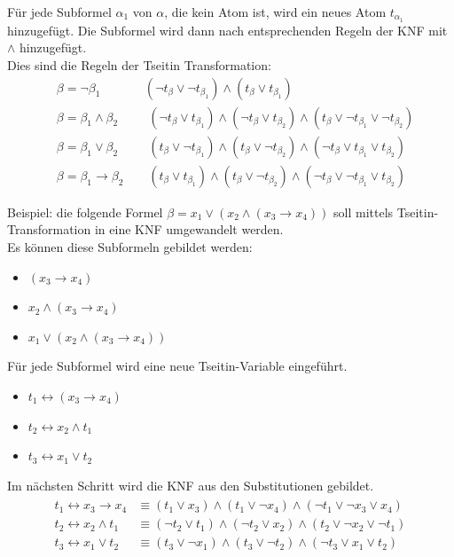 \documentclass[a4,abstract=on]{scrartcl}
\begin{document}
Für jede Subformel $\alpha_1$ von $\alpha$, die kein Atom ist, wird ein neues Atom $t_{\alpha_1}$ hinzugefügt. Die Subformel wird dann nach entsprechenden Regeln der KNF mit $\wedge$ hinzugefügt.\\

Dies sind die Regeln der Tseitin Transformation:
\begin{align*}
&\beta=\neg \beta_1 {~~~~~~~~~~~~~~~~} (\neg t_\beta \vee \neg t_{\beta_1 }) \wedge (t_\beta \vee t_{\beta_1})\\
&\beta=\beta_1 \wedge \beta_2 {~~~~~~~~~~~} (\neg t_\beta \vee  t_{\beta_1 }) \wedge (\neg t_\beta \vee t_{\beta_2}) \wedge (t_\beta \vee \neg t_{\beta_1} \vee \neg t_{\beta_2})\\
&\beta=\beta_1 \vee \beta_2 {~~~~~~~~~~~} (t_\beta \vee  \neg t_{\beta_1 }) \wedge (t_\beta \vee \neg t_{\beta_2}) \wedge (\neg t_\beta \vee t_{\beta_1} \vee t_{\beta_2})\\
&\beta=\beta_1 \rightarrow \beta_2 {~~~~~~~~~} (t_\beta \vee  t_{\beta_1 }) \wedge (t_\beta \vee \neg t_{\beta_2}) \wedge (\neg t_\beta \vee \neg t_{\beta_1} \vee t_{\beta_2})
\end{align*}

Beispiel: die folgende Formel $\beta = x_1 \vee (x_2 \wedge (x_3 \rightarrow x_4))$ soll mittels Tseitin-Transformation in eine KNF umgewandelt werden.\\
Es können diese Subformeln gebildet werden:\\
\begin{itemize}
\item $(x_3 \rightarrow x_4)$
\item $x_2 \wedge (x_3 \rightarrow x_4)$
\item $x_1 \vee (x_2 \wedge (x_3 \rightarrow x_4))$
\end{itemize}

Für jede Subformel wird eine neue Tseitin-Variable eingeführt.\\
\begin{itemize}
\item $t_1 \leftrightarrow (x_3 \rightarrow x_4)$
\item $t_2 \leftrightarrow x_2 \wedge t_1$
\item $t_3 \leftrightarrow x_1 \vee t_2$
\end{itemize}

Im nächsten Schritt wird die KNF aus den Substitutionen gebildet.\\
\begin{align*}
\begin{aligned}
t_1 \leftrightarrow x_3 \rightarrow x_4 &\equiv (t_1 \vee  x_3) \wedge (t_1 \vee \neg x_4) \wedge (\neg t_1 \vee \neg x_3 \vee x_4)\\
t_2 \leftrightarrow x_2 \wedge t_1 &\equiv (\neg t_2 \vee  t_1) \wedge (\neg t_2 \vee x_2) \wedge (t_2 \vee \neg x_2 \vee \neg t_1)\\
t_3 \leftrightarrow x_1 \vee t_2 &\equiv (t_3 \vee  \neg x_1) \wedge (t_3 \vee \neg t_2) \wedge (\neg t_3 \vee x_1 \vee t_2)\\
\end{aligned}
\end{align*}
\end{document}
